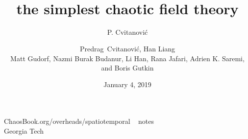 



\usepackage[font=scriptsize, labelfont=bf]{caption}
\usepackage[
    backend=biber,  %
    sorting=nyt,
    style=numeric, %
    natbib=true,
    style=phys, %
    biblabel= brackets, %
    articletitle=false, %
    pageranges = true , %
    sortlocale=en_US,
    firstinits=true,
    url=false, %
    doi=false, %
    eprint=false
]{biblatex}


\renewcommand{\Ssym}[1]{{\ensuremath{m_{#1}}}}    %
\newcommand{\D}{\mathcal{D}}
\newcommand{\gd}{\mathsf{g}}


\title{
{\huge \catlatt}
    \\
{the simplest chaotic field theory}
}
\author{P. Cvitanovi\'c}
\author[Cvitanovi\'c]
{
  \textcolor{green!50!black}{
  {Predrag~Cvitanovi\'c,
  Han Liang
   \\
  Matt Gudorf,
  Nazmi Burak Budanur,
        Li Han,
        Rana Jafari,
		Adrien K. Saremi,
  and
  Boris Gutkin
  }	%
  }
}
\institute
{
ChaosBook.org/overheads/spatiotemporal   ~ notes
\\
                Georgia Tech
 }
\date{January 4, 2019}

\begin{frame}
  \titlepage
\end{frame}


